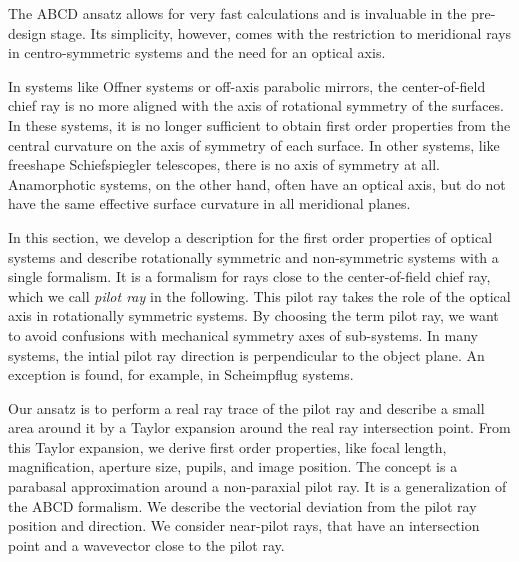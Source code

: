 \documentclass[12pt,a4paper,twoside,openright,BCOR10mm,headsepline,titlepage,abstracton,chapterprefix,final]{scrreprt}
\begin{document}
The ABCD ansatz allows for very fast calculations and is invaluable in the pre-design stage.
Its simplicity, however, comes with the restriction to meridional rays in centro-symmetric systems and the need for an optical axis.

In systems like Offner systems or off-axis parabolic mirrors, the center-of-field chief ray is no more aligned with the axis of rotational symmetry of the surfaces.
In these systems, it is no longer sufficient to obtain first order properties from the central curvature on the axis of symmetry of each surface.
In other systems, like freeshape Schiefspiegler telescopes, there is no axis of symmetry at all. 
Anamorphotic systems, on the other hand, often have an optical axis, but do not have the same effective surface curvature in all meridional planes.

In this section, we develop a description for the first order properties of optical systems 
and describe rotationally symmetric and non-symmetric systems with a single formalism.
It is a formalism for rays close to the center-of-field chief ray, which we call \emph{pilot ray} in the following.
This pilot ray takes the role of the optical axis in rotationally symmetric systems. 
By choosing the term pilot ray, we want to avoid confusions with mechanical symmetry axes of sub-systems.
In many systems, the intial pilot ray direction is perpendicular to the object plane. 
An exception is found, for example, in Scheimpflug systems.

Our ansatz is to perform a real ray trace of the pilot ray and describe a small area around it by a Taylor expansion around the real ray intersection point.
From this Taylor expansion, we derive first order properties, like focal length, magnification, aperture size, pupils, and image position.
The concept is a parabasal approximation around a non-paraxial pilot ray.
It is a generalization of the ABCD formalism. 
We describe the vectorial deviation from the pilot ray position and direction.
We consider near-pilot rays, that have an intersection point and a wavevector close to the pilot ray.
\end{document}
